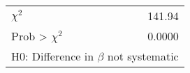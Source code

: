 \begin{tabular}{lr}
\toprule
$\chi^2$ &    141.94 \\
Prob > $\chi^2$ &    0.0000 \\
\bottomrule
\multicolumn{2}{l}{\footnotesize H0: Difference in $\beta$ not systematic}\\
\end{tabular}
